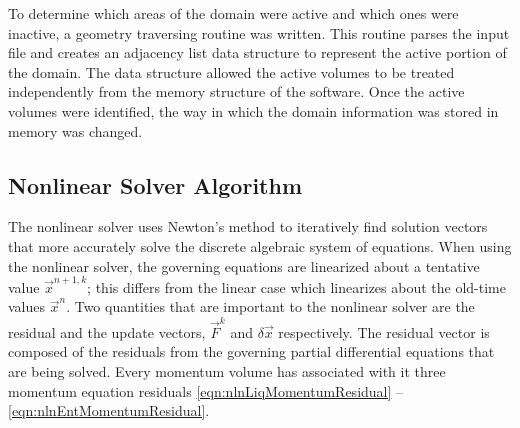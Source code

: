 To determine which areas of the domain were active and which ones were inactive, a geometry traversing routine was written.
This routine parses the \cobra{} input file and creates an adjacency list data structure to represent the active portion of the domain.
The data structure allowed the active volumes to be treated independently from the memory structure of the software.
Once the active volumes were identified, the way in which the domain information was stored in memory was changed.

\subsection{Nonlinear Solver Algorithm}
\label{subsect:nlnCobraAlgo}

The nonlinear solver uses Newton's method to iteratively find solution vectors that more accurately solve the discrete algebraic system of equations.
When using the nonlinear solver, the governing equations are linearized about a tentative value $\vec{x}^{n+1, k}$; this differs from the linear case which linearizes about the old-time values $\vec{x}^{n}$.
Two quantities that are important to the nonlinear solver are the residual and the update vectors, $\vec{F}^{k}$ and $\delta \vec{x}$ respectively.
The residual vector is composed of the residuals from the governing partial differential equations that are being solved.
Every momentum volume has associated with it three momentum equation residuals \eqref{eqn:nlnLiqMomentumResidual} -- \eqref{eqn:nlnEntMomentumResidual}.

